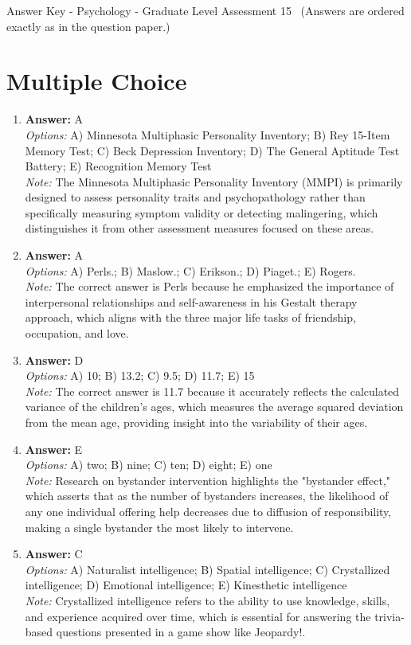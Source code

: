 \documentclass[12pt]{article}
\begin{document}
\begin{center}
Answer Key - Psychology - Graduate Level Assessment 15 \
\small (Answers are ordered exactly as in the question paper.)
\end{center}

\section*{Multiple Choice}
\begin{enumerate}[label=\arabic*.]
\item \textbf{Answer:} A
\\ \textit{Options:} A) Minnesota Multiphasic Personality Inventory; B) Rey 15-Item Memory Test; C) Beck Depression Inventory; D) The General Aptitude Test Battery; E) Recognition Memory Test
\\ \textit{Note:} The Minnesota Multiphasic Personality Inventory (MMPI) is primarily designed to assess personality traits and psychopathology rather than specifically measuring symptom validity or detecting malingering, which distinguishes it from other assessment measures focused on these areas.
\item \textbf{Answer:} A
\\ \textit{Options:} A) Perls.; B) Maslow.; C) Erikson.; D) Piaget.; E) Rogers.
\\ \textit{Note:} The correct answer is Perls because he emphasized the importance of interpersonal relationships and self-awareness in his Gestalt therapy approach, which aligns with the three major life tasks of friendship, occupation, and love.
\item \textbf{Answer:} D
\\ \textit{Options:} A) 10; B) 13.2; C) 9.5; D) 11.7; E) 15
\\ \textit{Note:} The correct answer is 11.7 because it accurately reflects the calculated variance of the children's ages, which measures the average squared deviation from the mean age, providing insight into the variability of their ages.
\item \textbf{Answer:} E
\\ \textit{Options:} A) two; B) nine; C) ten; D) eight; E) one
\\ \textit{Note:} Research on bystander intervention highlights the "bystander effect," which asserts that as the number of bystanders increases, the likelihood of any one individual offering help decreases due to diffusion of responsibility, making a single bystander the most likely to intervene.
\item \textbf{Answer:} C
\\ \textit{Options:} A) Naturalist intelligence; B) Spatial intelligence; C) Crystallized intelligence; D) Emotional intelligence; E) Kinesthetic intelligence
\\ \textit{Note:} Crystallized intelligence refers to the ability to use knowledge, skills, and experience acquired over time, which is essential for answering the trivia-based questions presented in a game show like Jeopardy!.
\end{enumerate}
\end{document}
